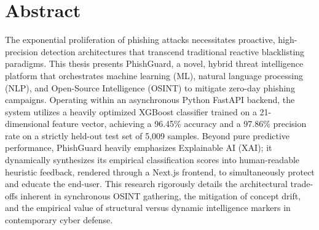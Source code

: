\section{Abstract}\label{abstract}

The exponential proliferation of phishing attacks necessitates
proactive, high-precision detection architectures that transcend
traditional reactive blacklisting paradigms. This thesis presents
PhishGuard, a novel, hybrid threat intelligence platform that
orchestrates machine learning (ML), natural language processing (NLP),
and Open-Source Intelligence (OSINT) to mitigate zero-day phishing
campaigns. Operating within an asynchronous Python FastAPI backend, the
system utilizes a heavily optimized XGBoost classifier trained on a
21-dimensional feature vector, achieving a 96.45\% accuracy and a
97.86\% precision rate on a strictly held-out test set of 5,009 samples.
Beyond pure predictive performance, PhishGuard heavily emphasizes
Explainable AI (XAI); it dynamically synthesizes its empirical
classification scores into human-readable heuristic feedback, rendered
through a Next.js frontend, to simultaneously protect and educate the
end-user. This research rigorously details the architectural trade-offs
inherent in synchronous OSINT gathering, the mitigation of concept
drift, and the empirical value of structural versus dynamic intelligence
markers in contemporary cyber defense.

